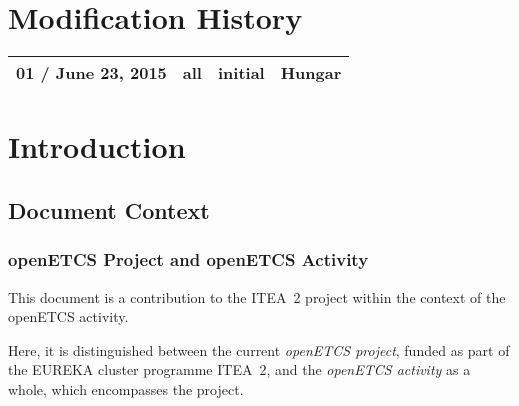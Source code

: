 \documentclass{template/openetcs_article}
\begin{document}
\maketitle



\section*{Modification History}
\begin{supertabular}{| m{3.2cm} | m{1.2cm} | m{4.6cm} | m{4cm} |}
 01 / June 23, 2015 & all & initial & Hungar \\\hline
\end{supertabular}


\tableofcontents
\listoffiguresandtables
\newpage






\section{Introduction}
\label{sec:introduction}

\subsection{Document Context} 
\label{sec:documemnt-context}

\subsubsection{openETCS Project and openETCS Activity}
\label{sec:project-activity}

This document is a contribution to the ITEA~2 project within the
context of the openETCS activity.

Here, it is distinguished between the current \emph{openETCS project}, funded as
part of the EUREKA cluster programme ITEA~2, and the \emph{openETCS activity}
as a whole, which encompasses the project.
\end{document}
